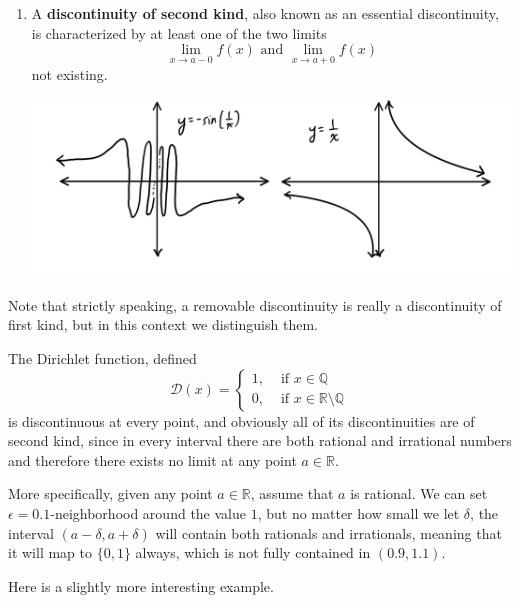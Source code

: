 \begin{definition}[Discontinuity]
\begin{enumerate}
\begin{center}
      \end{center}
      \item A \textbf{discontinuity of second kind}, also known as an essential discontinuity, is characterized by at least one of the two limits 
      \[\lim_{x \rightarrow a-0} f(x) \text{ and } \lim_{x \rightarrow a+0} f(x)\]
      not existing. 
      \begin{center}
          \includegraphics[scale=0.23]{img/Discontinuity_Second.PNG}
      \end{center}
    \end{enumerate}
    Note that strictly speaking, a removable discontinuity is really a discontinuity of first kind, but in this context we distinguish them. 
  \end{definition}

  \begin{example}
    The Dirichlet function, defined
    \[\mathcal{D}(x) = \begin{cases}
    1, & \text{ if } x \in \mathbb{Q} \\
    0, & \text{ if } x \in \mathbb{R} \setminus \mathbb{Q} 
    \end{cases}\]
    is discontinuous at every point, and obviously all of its discontinuities are of second kind, since in every interval there are both rational and irrational numbers and therefore there exists no limit at any point $a \in \mathbb{R}$. 

    More specifically, given any point $a \in \mathbb{R}$, assume that $a$ is rational. We can set $\epsilon = 0.1$-neighborhood around the value $1$, but no matter how small we let $\delta$, the interval $(a - \delta, a + \delta)$ will contain both rationals and irrationals, meaning that it will map to $\{0,1\}$ always, which is not fully contained in $(0.9, 1.1)$.  
  \end{example}

  Here is a slightly more interesting example. 

